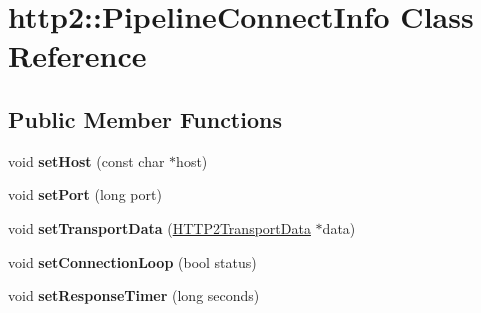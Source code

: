 \hypertarget{classhttp2_1_1PipelineConnectInfo}{}\section{http2\+:\+:Pipeline\+Connect\+Info Class Reference}
\label{classhttp2_1_1PipelineConnectInfo}
\subsection*{Public Member Functions}
\begin{DoxyCompactItemize}
\item 
\mbox{\label{classhttp2_1_1PipelineConnectInfo_a53dc6a640efbfa266b0eb4ad87944384}} 
void {\bfseries set\+Host} (const char $\ast$host)
\item 
\mbox{\label{classhttp2_1_1PipelineConnectInfo_ad92246bbb1158932324d8f06863fe9ff}} 
void {\bfseries set\+Port} (long port)
\item 
\mbox{\label{classhttp2_1_1PipelineConnectInfo_a4f1bac6d08273915170d530f407eedd0}} 
void {\bfseries set\+Transport\+Data} (\hyperlink{classhttp2_1_1HTTP2TransportData}{H\+T\+T\+P2\+Transport\+Data} $\ast$data)
\item 
\mbox{\label{classhttp2_1_1PipelineConnectInfo_a52ebef9e2685857bfbac49d54758ec66}} 
void {\bfseries set\+Connection\+Loop} (bool status)
\item 
\mbox{\label{classhttp2_1_1PipelineConnectInfo_ab5d678c1ea94bc0ce3f3c0a41034b56b}} 
void {\bfseries set\+Response\+Timer} (long seconds)
\end{DoxyCompactItemize}
